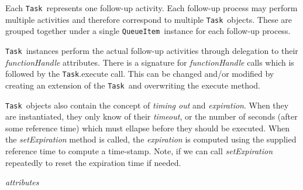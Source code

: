 \documentclass{article}
\newcommand{\QueueItem}{\texttt{QueueItem}}
\newcommand{\Task}{\texttt{Task}}
\begin{document}
Each \Task~represents one follow-up activity.
Each follow-up process may perform multiple activities and therefore correspond to multiple \Task~objects.
These are grouped together under a single \QueueItem~instance for each follow-up process.

\Task~instances perform the actual follow-up activities through delegation to their \textit{functionHandle} attributes.
There is a signature for \textit{functionHandle} calls which is followed by the \Task.execute call.
This can be changed and/or modified by creating an extension of the \Task~and overwriting the execute method.

\Task~objects also contain the concept of \textit{timing out} and \textit{expiration}.
When they are instantiated, they only know of their \textit{timeout}, or the number of seconds (after some reference time) which must ellapse before they should be executed.
When the \textit{setExpiration} method is called, the \textit{expiration} is computed using the supplied reference time to compute a time-stamp.
Note, if we can call \textit{setExpiration} repeatedly to reset the expiration time if needed.

\vspace{0.5cm}
\noindent
\textit{attributes}
\end{document}
